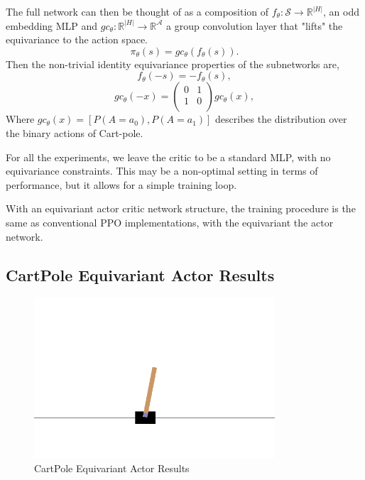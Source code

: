 The full network can then be thought of as a composition of $f_\theta : \mathcal{S} \rightarrow \mathbb{R}^{|H|}$, an odd embedding MLP and $gc_\theta: \mathbb{R}^{|H|} \rightarrow \mathbb{R}^{\mathcal{A}}$ a group convolution layer that "lifts" the equivariance to the action space.
\begin{equation}
	\pi_\theta(s) = gc_\theta(f_\theta(s)).
\end{equation}
Then the non-trivial identity equivariance properties of the subnetworks are,
\begin{equation}
	f_\theta(-s) = -f_\theta(s),
\end{equation}
\begin{equation}
	gc_\theta(-x) =
	\begin{pmatrix}
		0 & 1 \\
		1 & 0 \\
	\end{pmatrix}
	gc_\theta(x),
\end{equation}
Where $gc_\theta(x) = [P(A=a_0), P(A=a_1)]$ describes the distribution over the binary actions of Cart-pole.


For all the experiments, we leave the critic to be a standard MLP, with no equivariance constraints. This may be a non-optimal setting in terms of performance, but it allows for a simple training loop.

With an equivariant actor critic network structure, the training procedure is the same as conventional PPO implementations, with the equivariant the actor network.

\subsection{CartPole Equivariant Actor Results}
\begin{figure}[H]
	\centering
	\includegraphics[width=0.8\textwidth]{Figures/cart_pole.png}
	\caption{CartPole Equivariant Actor Results} \label{fig:cartpole_equivariant_actor}
\end{figure}
